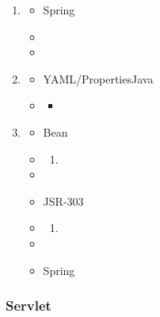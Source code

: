 
\begin{enumerate}
\def\labelenumi{\arabic{enumi}.}
\item
  \important{}

  \begin{itemize}
  \item
    Spring
  \item
  \item
  \end{itemize}
\item
  \important{}

  \begin{itemize}
  \item
    YAML/PropertiesJava
  \item
    \begin{itemize}
    \item
    \end{itemize}
  \end{itemize}
\item
  \important{}

  \begin{itemize}
  \item
    Bean
  \item
    \begin{enumerate}
    \def\labelenumii{\arabic{enumii}.}
        \item
      \important{}
    \end{enumerate}
  \item
  \item
    JSR-303
  \item
    \begin{enumerate}
    \def\labelenumii{\arabic{enumii}.}
        \item
      \important{}
    \end{enumerate}
  \item
  \item
    Spring
  \end{itemize}
\end{enumerate}

\hypertarget{servlet}{%
\subsubsection{Servlet}\label{servlet}}

